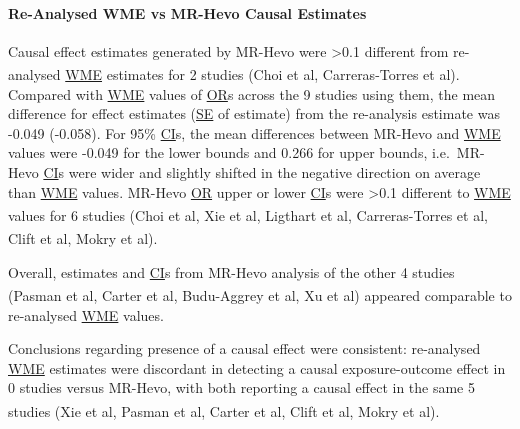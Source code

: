 \documentclass[
]{article}
\begin{document}
\paragraph{Re-Analysed WME vs MR-Hevo Causal Estimates}\label{re-analysed-wme-vs-mr-hevo-causal-estimates}

\leavevmode\newline Causal effect estimates generated by MR-Hevo were \textgreater0.1 different from re-analysed \hyperref[acronyms_WME]{WME} estimates for 2 studies (Choi et al\textsuperscript{}, Carreras-Torres et al\textsuperscript{}). Compared with \hyperref[acronyms_WME]{WME} values of \hyperref[acronyms_OR]{OR}s across the 9 studies using them, the mean difference for effect estimates (\hyperref[acronyms_SE]{SE} of estimate) from the re-analysis estimate was -0.049 (-0.058). For 95\% \hyperref[acronyms_CI]{CI}s, the mean differences between MR-Hevo and \hyperref[acronyms_WME]{WME} values were -0.049 for the lower bounds and 0.266 for upper bounds, i.e.~MR-Hevo \hyperref[acronyms_CI]{CI}s were wider and slightly shifted in the negative direction on average than \hyperref[acronyms_WME]{WME} values. MR-Hevo \hyperref[acronyms_OR]{OR} upper or lower \hyperref[acronyms_CI]{CI}s were \textgreater0.1 different to \hyperref[acronyms_WME]{WME} values for 6 studies (Choi et al\textsuperscript{}, Xie et al\textsuperscript{}, Ligthart et al\textsuperscript{}, Carreras-Torres et al\textsuperscript{}, Clift et al\textsuperscript{}, Mokry et al\textsuperscript{}).

Overall, estimates and \hyperref[acronyms_CI]{CI}s from MR-Hevo analysis of the other 4 studies (Pasman et al\textsuperscript{}, Carter et al\textsuperscript{}, Budu-Aggrey et al\textsuperscript{}, Xu et al\textsuperscript{}) appeared comparable to re-analysed \hyperref[acronyms_WME]{WME} values.

Conclusions regarding presence of a causal effect were consistent: re-analysed \hyperref[acronyms_WME]{WME} estimates were discordant in detecting a causal exposure-outcome effect in 0 studies versus MR-Hevo, with both reporting a causal effect in the same 5 studies (Xie et al\textsuperscript{}, Pasman et al\textsuperscript{}, Carter et al\textsuperscript{}, Clift et al\textsuperscript{}, Mokry et al\textsuperscript{}).
\end{document}
